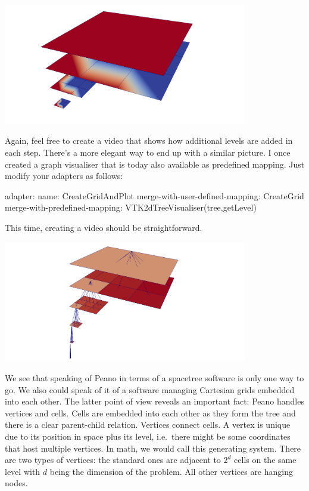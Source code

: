 \begin{center}
  \includegraphics[width=0.8\textwidth]{3_basics/tree00.png}
\end{center}

\noindent
Again, feel free to create a video that shows how additional levels are added in
each step.
There's a more elegant way to end up with a similar picture. 
I once created a graph visualiser that is today also available as predefined
mapping. Just modify your adapters as follows:

\begin{code}
adapter:
  name: CreateGridAndPlot
  merge-with-user-defined-mapping: CreateGrid
  merge-with-predefined-mapping: VTK2dTreeVisualiser(tree,getLevel)
\end{code}

\noindent
This time, creating a video should be straightforward.
\begin{center}
  \includegraphics[width=0.8\textwidth]{3_basics/tree01.png}
\end{center}

We see that speaking of Peano in terms of a spacetree software is only one way
to go.
We also could speak of it of a software managing Cartesian grids embedded into
each other.
The latter point of view reveals an important fact:
Peano handles vertices and cells.
Cells are embedded into each other as they form the tree and there is a clear
parent-child relation.
Vertices connect cells.
A vertex is unique due to its position in space plus its level, i.e.~there might
be some coordinates that host multiple vertices.
In math, we would call this generating system.
There are two types of vertices:
the standard ones are adjacent to $2^d$ cells on the same level with $d$ being
the dimension of the problem.
All other vertices are hanging nodes.

